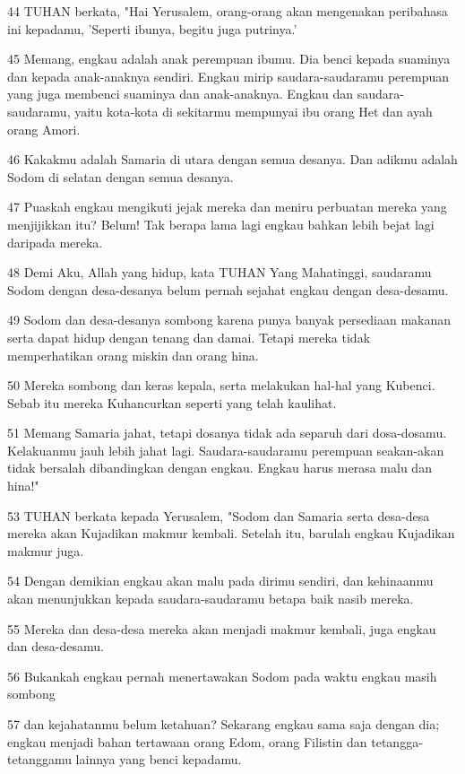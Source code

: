 \par 44 TUHAN berkata, "Hai Yerusalem, orang-orang akan mengenakan peribahasa ini kepadamu, 'Seperti ibunya, begitu juga putrinya.'
\par 45 Memang, engkau adalah anak perempuan ibumu. Dia benci kepada suaminya dan kepada anak-anaknya sendiri. Engkau mirip saudara-saudaramu perempuan yang juga membenci suaminya dan anak-anaknya. Engkau dan saudara-saudaramu, yaitu kota-kota di sekitarmu mempunyai ibu orang Het dan ayah orang Amori.
\par 46 Kakakmu adalah Samaria di utara dengan semua desanya. Dan adikmu adalah Sodom di selatan dengan semua desanya.
\par 47 Puaskah engkau mengikuti jejak mereka dan meniru perbuatan mereka yang menjijikkan itu? Belum! Tak berapa lama lagi engkau bahkan lebih bejat lagi daripada mereka.
\par 48 Demi Aku, Allah yang hidup, kata TUHAN Yang Mahatinggi, saudaramu Sodom dengan desa-desanya belum pernah sejahat engkau dengan desa-desamu.
\par 49 Sodom dan desa-desanya sombong karena punya banyak persediaan makanan serta dapat hidup dengan tenang dan damai. Tetapi mereka tidak memperhatikan orang miskin dan orang hina.
\par 50 Mereka sombong dan keras kepala, serta melakukan hal-hal yang Kubenci. Sebab itu mereka Kuhancurkan seperti yang telah kaulihat.
\par 51 Memang Samaria jahat, tetapi dosanya tidak ada separuh dari dosa-dosamu. Kelakuanmu jauh lebih jahat lagi. Saudara-saudaramu perempuan seakan-akan tidak bersalah dibandingkan dengan engkau. Engkau harus merasa malu dan hina!"
\par 53 TUHAN berkata kepada Yerusalem, "Sodom dan Samaria serta desa-desa mereka akan Kujadikan makmur kembali. Setelah itu, barulah engkau Kujadikan makmur juga.
\par 54 Dengan demikian engkau akan malu pada dirimu sendiri, dan kehinaanmu akan menunjukkan kepada saudara-saudaramu betapa baik nasib mereka.
\par 55 Mereka dan desa-desa mereka akan menjadi makmur kembali, juga engkau dan desa-desamu.
\par 56 Bukankah engkau pernah menertawakan Sodom pada waktu engkau masih sombong
\par 57 dan kejahatanmu belum ketahuan? Sekarang engkau sama saja dengan dia; engkau menjadi bahan tertawaan orang Edom, orang Filistin dan tetangga-tetanggamu lainnya yang benci kepadamu.
